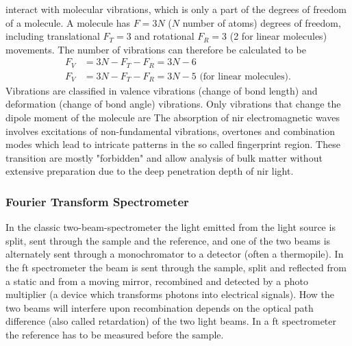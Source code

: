 interact with molecular vibrations, which is only a part of the degrees of freedom of a molecule.
A molecule has $F=3N$ ($N$ number of atoms) degrees of freedom, including translational $F_T=3$ and rotational $F_R=3$ (2 for linear molecules) movements. 
%
The number of vibrations can therefore be calculated to be
\begin{align*}
	F_V &= 3N - F_T - F_R = 3N - 6 \\
	F_V &= 3N - F_T - F_R = 3N - 5 \textrm{ (for linear molecules)}.
\end{align*}
Vibrations are classified in valence vibrations (change of bond length) and deformation (change of bond angle) vibrations\cite{Melker2006}. 
Only vibrations that change the dipole moment of the molecule are 
The absorption of \Gls{nir} electromagnetic waves involves excitations of non-fundamental vibrations, overtones and combination modes which lead to intricate patterns in the so called fingerprint region. 
These transition are mostly "forbidden" and allow analysis of bulk matter without extensive preparation
due to the deep penetration depth of \gls{nir} light\cite{bec2019breakthrough}.


\subsubsection{Fourier Transform Spectrometer}
In the classic two-beam-spectrometer the light emitted from the light source is split, 
sent through the sample and the reference, and one of the two beams is alternately 
sent through a monochromator to a detector (often a thermopile).
%
In the \gls{ft} spectrometer the beam is sent through the sample, split and 
reflected from a static and from a moving mirror, recombined and detected by a photo 
multiplier (a device which transforms photons into electrical signals). 
How the two beams will interfere upon recombination depends on the optical path difference (also called retardation) of the two light beams\cite{Schwedt2008}.
In a \gls{ft} spectrometer the reference has to be measured before the sample.
%


